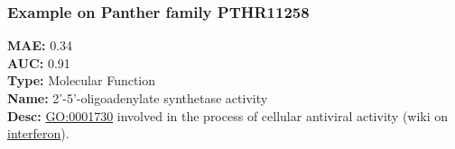 \documentclass[aspectratio=169, 9pt, handout]{beamer}
\begin{document}
\begin{frame}[t, label=phylo-good]
	\frametitle{Example on Panther family PTHR11258}
	
	\begin{minipage}[m]{.3\linewidth}
		\small
		\textbf{MAE:} 0.34 \\
		\textbf{AUC:} 0.91 \\
		\textbf{Type:} Molecular Function\\
		\textbf{Name:} 2'-5'-oligoadenylate synthetase activity\\
		\textbf{Desc:}  \href{http://amigo.geneontology.org/amigo/term/GO:0001730}{\alert{GO:0001730}} involved in the process of cellular antiviral activity (wiki on \href{https://en.wikipedia.org/wiki/Interferon}{\alert{interferon}}).
		\vfill
		\hyperlink{phylo-bad}{}
	\end{minipage}
	\begin{minipage}[m]{.65\linewidth}
		\def\tmpwdth{.9\linewidth}
\end{minipage}
\end{frame}
\end{document}
